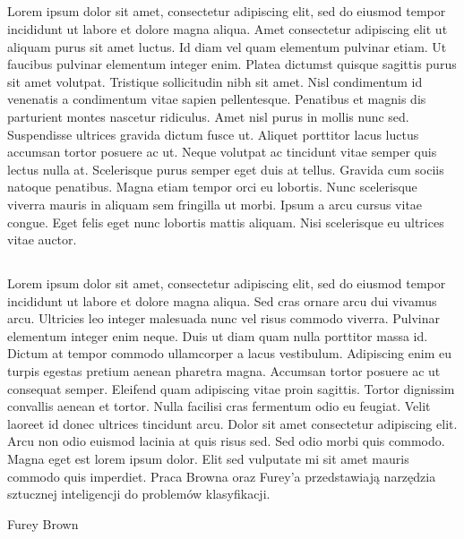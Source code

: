 \documentclass{book}
\begin{document}
\subsection{}
Lorem ipsum dolor sit amet, consectetur adipiscing elit, sed do eiusmod tempor incididunt ut labore et dolore magna aliqua. Amet consectetur adipiscing elit ut aliquam purus sit amet luctus. Id diam vel quam elementum pulvinar etiam. Ut faucibus pulvinar elementum integer enim. Platea dictumst quisque sagittis purus sit amet volutpat. Tristique sollicitudin nibh sit amet. Nisl condimentum id venenatis a condimentum vitae sapien pellentesque. Penatibus et magnis dis parturient montes nascetur ridiculus. Amet nisl purus in mollis nunc sed. Suspendisse ultrices gravida dictum fusce ut. Aliquet porttitor lacus luctus accumsan tortor posuere ac ut. Neque volutpat ac tincidunt vitae semper quis lectus nulla at. Scelerisque purus semper eget duis at tellus. Gravida cum sociis natoque penatibus. Magna etiam tempor orci eu lobortis. Nunc scelerisque viverra mauris in aliquam sem fringilla ut morbi. Ipsum a arcu cursus vitae congue. Eget felis eget nunc lobortis mattis aliquam. Nisi scelerisque eu ultrices vitae auctor.

\subsection{}
Lorem ipsum dolor sit amet, consectetur adipiscing elit, sed do eiusmod tempor incididunt ut labore et dolore magna aliqua. Sed cras ornare arcu dui vivamus arcu. Ultricies leo integer malesuada nunc vel risus commodo viverra. Pulvinar elementum integer enim neque. Duis ut diam quam nulla porttitor massa id. Dictum at tempor commodo ullamcorper a lacus vestibulum. Adipiscing enim eu turpis egestas pretium aenean pharetra magna. Accumsan tortor posuere ac ut consequat semper. Eleifend quam adipiscing vitae proin sagittis. Tortor dignissim convallis aenean et tortor. Nulla facilisi cras fermentum odio eu feugiat. Velit laoreet id donec ultrices tincidunt arcu. Dolor sit amet consectetur adipiscing elit. Arcu non odio euismod lacinia at quis risus sed. Sed odio morbi quis commodo. Magna eget est lorem ipsum dolor. Elit sed vulputate mi sit amet mauris commodo quis imperdiet.
Praca Browna \cite{brown} oraz Furey'a \cite{furey} przedstawiają narzędzia sztucznej inteligencji do problemów klasyfikacji.
\begin{thebibliography}{2} 
 Furey 
 Brown 
\end{thebibliography}
\end{document}
